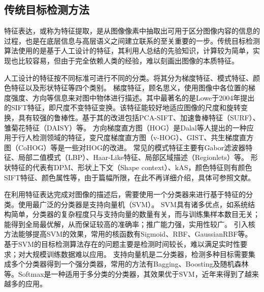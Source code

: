 \subsection{传统目标检测方法}
特征表达，或称为特征提取，是从图像像素中抽取出可用于区分图像内容的信息的过程，也是在底层信息与高层语义之间建立联系的至关重要的一步。传统目标检测算法使用的是基于人工设计的特征，其利用人总结的先验知识，计算较为简单，实现也比较容易，但由于完全依赖人类的经验，难以刻画出图像的本质特征。

人工设计的特征按不同标准可进行不同的分类。\cite{尹宏鹏2016}将其分为梯度特征、模式特征、颜色特征以及形状特征等四个类别。%
梯度特征，顾名思义，使用图像中各位置的梯度强度、方向等信息来对图中物体进行描述。其中最著名的是Lowe于2004年提出的SIFT特征\cite{Lowe2004Distinctive}，即尺度不变特征变换。该特征能较好地适应图像的尺度和旋转变换，具有较强的鲁棒性。基于其的改进包括PCA-SIFT\cite{Ke2004PCA}、加速鲁棒特征（SURF）\cite{Bay2006SURF}、雏菊花特征（DAISY）\cite{Tola2010DAISY}等。
方向梯度直方图（HOG）\cite{Dalal2005Histograms}是Dalal等人提出的一种应用于行人检测领域的特征，变尺度梯度直方图（v-HOG）\cite{Zhu2006Fast}、GIST\cite{Torralba2006Contextual}、共生梯度直方图（CoHOG）\cite{Watanabe2009Co}等是一些对HOG的改进。
常见的模式特征主要有Gabor滤波器特征\cite{Jain1997Object}、局部二值模式（LBP）\cite{Zhou20103D}、Haar-Like特征\cite{Viola2001Robust}、局部区域描述（Regionlets）\cite{Wang2014Regionlets}等。
形状特征的代表有DPM\cite{felzenszwalb2010object}、形状上下文（Shape context）\cite{belongie2002shape}、kAS\cite{ferrari2008groups}，颜色特征则有颜色SIFT特征\cite{rassem2011object}、颜色属性\cite{van2009learning}等，由于篇幅所限，在此不再详细介绍，具体可参照文献\cite{尹宏鹏2016}。

在利用特征表达完成对图像的描述后，需要使用一个分类器来进行基于特征的分类。使用最广泛的分类器是支持向量机（SVM）\cite{kotsiantis2006machine}。
SVM具有诸多优点\cite{郭明玮2014}，如系统结构简单，分类器的复杂程度只与支持向量的数量有关，而与训练集样本数目无关；能得到全局最优解，从而保证较高的准确率；推广能力强，实用性较广。
引入核方法能够提高SVM的效果，常用的核函数有Sigmoid、RBF、GaussianRBF等\cite{scholkopf2001learning}。
基于SVM的目标检测算法存在的问题主要是检测时间较长，难以满足实时性要求；对大规模训练数据难以应用。
支持向量机是二分类器，检测多种目标需要集成多个分类器得到一个强分类器，常用的方法有Bagging、Boosting及随机森林等。Softmax是一种适用于多分类的分类器，其效果优于SVM，近年来得到了越来越多的应用。

